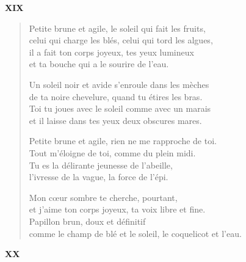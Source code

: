 \documentclass[11pt,a4paper]{book}
\begin{document}
\newpage


\begin{center} \textbf{XIX} \end{center}

\bigskip

\begin{verse}
  Petite brune et agile, le soleil qui fait les fruits, \\
  celui qui charge les blés, celui qui tord les algues, \\
  il a fait ton corps joyeux, tes yeux lumineux \\
  et ta bouche qui a le sourire de l'eau.

  Un soleil noir et avide s'enroule dans les mèches \\
  de ta noire chevelure, quand tu étires les bras. \\
  Toi tu joues avec le soleil comme avec un marais \\
  et il laisse dans tes yeux deux obscures mares.

  Petite brune et agile, rien ne me rapproche de toi. \\
  Tout m'éloigne de toi, comme du plein midi. \\
  Tu es la délirante jeunesse de l'abeille, \\
  l'ivresse de la vague, la force de l'épi.

  Mon cœur sombre te cherche, pourtant, \\
  et j'aime ton corps joyeux, ta voix libre et fine. \\
  Papillon brun, doux et définitif \\
  comme le champ de blé et le soleil, le coquelicot et l'eau.
\end{verse}

\newpage


\begin{center} \textbf{XX} \end{center}

\bigskip
\end{document}
